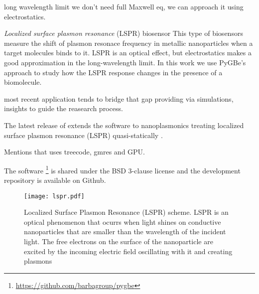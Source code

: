 long wavelength limit we don't need full Maxwell eq, we can approach it using
electrostatics.

\textit{Localized surface plasmon resonance} (LSPR) biosensor This type
of biosensors measure the shift of plasmon resonace frequency in metallic nanoparticles
when a target molecules binds to it. LSPR is an optical effect, but electrostatics 
makes a good approximation in the long-wavelength limit. In this work we use
PyGBe's approach to study how the LSPR response changes in the presence of a 
biomolecule.


\pygbe most recent 
application \cite{ClementiETal2017} tends to bridge that gap providing via
simulations, insights to guide the reasearch process. 

The latest release of \pygbe
extends the software to nanoplasmonics treating localized surface plasmon 
resonance (LSPR) quasi-statically \cite{MayergoyzZhang2007}.

Mentions that uses treecode, gmres and GPU. 

The software \footnote{\url{https://github.com/barbagroup/pygbe}} is shared 
under the BSD 3-clause license and the development repository is available on 
Github.












\begin{figure}[h] %
   \centering
   \texttt{[image: lspr.pdf]} 
   \caption{Localized Surface Plasmon Resonance (LSPR) scheme. LSPR is an 
            optical phenomenon that ocurrs when light shines on conductive 
            nanoparticles that are smaller than the wavelength of the incident 
            light. The free electrons on the surface of the nanoparticle are 
            excited by the incoming electric field oscillating with it and 
            creating plasmons}
   \label{fig:lspr}
\end{figure}




